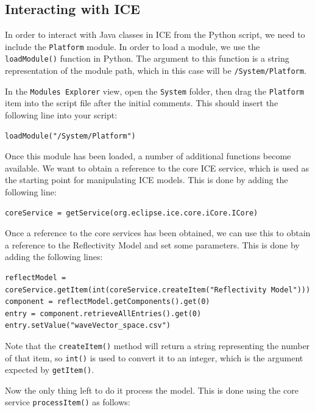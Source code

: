 \subsection{Interacting with ICE}

In order to interact with Java classes in ICE from the Python script, we 
need to include the \texttt{Platform} module. In order to load a module, we use
the \texttt{loadModule()} function in Python. The argument to this function is a
string representation of the module path, which in this case will be
\texttt{/System/Platform}. 

In the \texttt{Modules Explorer} view, open the \texttt{System} folder, then drag
the \texttt{Platform} item into the script file after the initial comments. This
should insert the following line into your script:

\lstset{basicstyle=\ttfamily\small, breaklines}

{\small
\begin{verbatim}
loadModule("/System/Platform")
\end{verbatim}
}

Once this module has been loaded, a number of additional functions become
available. We want to obtain a reference to the core ICE service, which is used
as the starting point for manipulating ICE models. This is done by adding the
following line:

{\small
\begin{verbatim}
coreService = getService(org.eclipse.ice.core.iCore.ICore)
\end{verbatim}
}

Once a reference to the core services has been obtained, we can use this to
obtain a reference to the Reflectivity Model and set some parameters. This is
done by adding the following lines:

{\small
\begin{verbatim}
reflectModel = coreService.getItem(int(coreService.createItem("Reflectivity Model")))
component = reflectModel.getComponents().get(0)
entry = component.retrieveAllEntries().get(0)
entry.setValue("waveVector_space.csv")
\end{verbatim}
}

Note that the \texttt{createItem()} method will return a string representing the
number of that item, so \texttt{int()} is used to convert it to an integer, which is the
argument expected by \texttt{getItem()}.

Now the only thing left to do it process the model. This is done using the core
service \texttt{processItem()} as follows:

